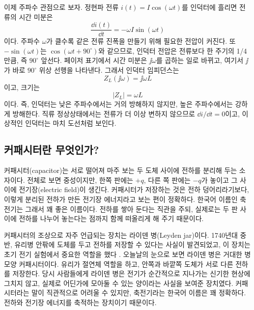 이제 주파수 관점으로 보자.
정현파 전류 $i(t)=I\cos(\omega t)$를 인덕터에 흘리면 전류의 시간 미분은
\begin{equation}
  \frac{\dd i(t)}{\dd t}
  =
  -\omega I\sin(\omega t)
\end{equation}
이다.
주파수 $\omega$가 클수록 같은 전류 진폭을 만들기 위해 필요한 전압이 커진다.
또 $-\sin(\omega t)$는 $\cos(\omega t+90^\circ)$와 같으므로, 인덕터 전압은 전류보다 한 주기의 1/4만큼, 즉 $90^\circ$ 앞선다.
페이저 표기에서 시간 미분은 $\jj\omega$를 곱하는 일로 바뀌고, 여기서 $\jj$가 바로 $90^\circ$ 위상 선행을 나타낸다.
그래서 인덕터 임피던스는
\begin{equation}
  Z_L(\jj\omega)=\jj\omega L
\end{equation}
이고, 크기는
\begin{equation}
  |Z_L|=\omega L
\end{equation}
이다.
즉, 인덕터는 낮은 주파수에서는 거의 방해하지 않지만, 높은 주파수에서는 강하게 방해한다.
직류 정상상태에서는 전류가 더 이상 변하지 않으므로 $\dd i/\dd t=0$이고, 이상적인 인덕터는 마치 도선처럼 보인다.

\subsection{커패시터란 무엇인가?}

커패시터(capacitor)는 서로 떨어져 마주 보는 두 도체 사이에 전하를 분리해 두는 소자이다.
전체로 보면 중성이지만, 한쪽 판에는 $+q$, 다른 쪽 판에는 $-q$가 놓이고 그 사이에 전기장(electric field)이 생긴다.
커패시터가 저장하는 것은 전하 덩어리라기보다, 이렇게 분리된 전하가 만든 전기장 에너지라고 보는 편이 정확하다.
한국어 이름인 축전기는 그래서 꽤 좋은 이름이다.
전하를 쌓아 둔다는 직관을 주되, 실제로는 두 판 사이에 전하를 나누어 놓는다는 점까지 함께 떠올리게 해 주기 때문이다.

커패시터의 조상으로 자주 언급되는 장치는 라이덴 병(Leyden jar)이다.
1740년대 중반, 유리병 안팎에 도체를 두고 전하를 저장할 수 있다는 사실이 발견되었고, 이 장치는 초기 전기 실험에서 중요한 역할을 했다 \cite{leyden_jar}.
오늘날의 눈으로 보면 라이덴 병은 거대한 병 모양 커패시터이다.
유리가 절연체 역할을 하고, 안쪽과 바깥쪽 도체가 서로 다른 전하를 저장한다.
당시 사람들에게 라이덴 병은 전기가 순간적으로 지나가는 신기한 현상에 그치지 않고, 실제로 어딘가에 모아둘 수 있는 양이라는 사실을 보여준 장치였다.
커패시터라는 말이 직관적으로 어려울 수 있지만, 축전기라는 한국어 이름은 꽤 정확하다.
전하와 전기장 에너지를 축적하는 장치이기 때문이다.

